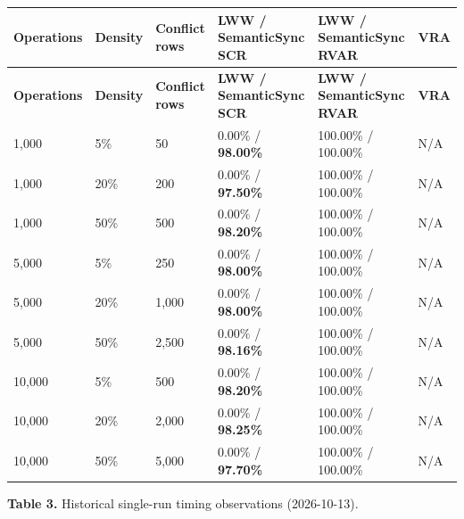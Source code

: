 \documentclass[runningheads]{llncs}
\begin{document}
\begin{longtable}{p{}p{}p{}p{}p{}p{}}
\textbf{Operations} & \textbf{Density} & \textbf{Conflict rows} & \textbf{LWW / SemanticSync SCR} & \textbf{LWW / SemanticSync RVAR} & \textbf{VRA} \\\hline
\endfirsthead\hline \textbf{Operations} & \textbf{Density} & \textbf{Conflict rows} & \textbf{LWW / SemanticSync SCR} & \textbf{LWW / SemanticSync RVAR} & \textbf{VRA} \\\hline\endhead
1,000 & 5\% & 50 & 0.00\% / \textbf{98.00\%} & 100.00\% / 100.00\% & N/A \\
1,000 & 20\% & 200 & 0.00\% / \textbf{97.50\%} & 100.00\% / 100.00\% & N/A \\
1,000 & 50\% & 500 & 0.00\% / \textbf{98.20\%} & 100.00\% / 100.00\% & N/A \\
5,000 & 5\% & 250 & 0.00\% / \textbf{98.00\%} & 100.00\% / 100.00\% & N/A \\
5,000 & 20\% & 1,000 & 0.00\% / \textbf{98.00\%} & 100.00\% / 100.00\% & N/A \\
5,000 & 50\% & 2,500 & 0.00\% / \textbf{98.16\%} & 100.00\% / 100.00\% & N/A \\
10,000 & 5\% & 500 & 0.00\% / \textbf{98.20\%} & 100.00\% / 100.00\% & N/A \\
10,000 & 20\% & 2,000 & 0.00\% / \textbf{98.25\%} & 100.00\% / 100.00\% & N/A \\
10,000 & 50\% & 5,000 & 0.00\% / \textbf{97.70\%} & 100.00\% / 100.00\% & N/A \\
\end{longtable}
\textbf{Table 3.} Historical single-run timing observations (2026-10-13).
\end{document}
